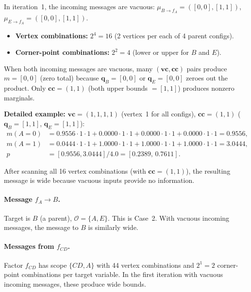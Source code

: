 \documentclass{article}
\begin{document}
In iteration~1, the incoming messages are vacuous: $\mu_{B \to f_A} = ([0,0],[1,1])$,
$\mu_{E \to f_A} = ([0,0],[1,1])$.

\begin{itemize}
\item \textbf{Vertex combinations:} $2^4 = 16$ (2 vertices per each of 4 parent configs).
\item \textbf{Corner-point combinations:} $2^2 = 4$ (lower or upper for $B$ and $E$).
\end{itemize}

When both incoming messages are vacuous, many $(\mathbf{vc}, \mathbf{cc})$ pairs
produce $m = [0, 0]$ (zero total) because $\mathbf{q}_B = [0,0]$ or
$\mathbf{q}_E = [0,0]$ zeroes out the product.
Only $\mathbf{cc} = (1,1)$ (both upper bounds $=[1,1]$) produces nonzero marginals.

\textbf{Detailed example:} $\mathbf{vc} = (1,1,1,1)$ (vertex~1 for all configs),
$\mathbf{cc} = (1,1)$ ($\mathbf{q}_B = [1,1]$, $\mathbf{q}_E = [1,1]$):
\begin{align*}
  m(A{=}0) &= 0.9556 \cdot 1 \cdot 1 + 0.0000 \cdot 1 \cdot 1
              + 0.0000 \cdot 1 \cdot 1 + 0.0000 \cdot 1 \cdot 1 = 0.9556, \\
  m(A{=}1) &= 0.0444 \cdot 1 \cdot 1 + 1.0000 \cdot 1 \cdot 1
              + 1.0000 \cdot 1 \cdot 1 + 1.0000 \cdot 1 \cdot 1 = 3.0444, \\
  p &= [0.9556, 3.0444] / 4.0 = [0.2389,\, 0.7611].
\end{align*}

After scanning all 16 vertex combinations (with $\mathbf{cc} = (1,1)$),
the resulting message is wide because vacuous inputs provide no information.

\paragraph{Message $f_A \to B$.}
Target is $B$ (a parent), $\mathcal{O} = \{A, E\}$. This is Case~2.
With vacuous incoming messages, the message to $B$ is similarly wide.

\paragraph{Messages from $f_{CD}$.}
Factor $f_{CD}$ has scope $\{CD, A\}$ with 44 vertex combinations and $2^1 = 2$
corner-point combinations per target variable. In the first iteration with
vacuous incoming messages, these produce wide bounds.
\end{document}
